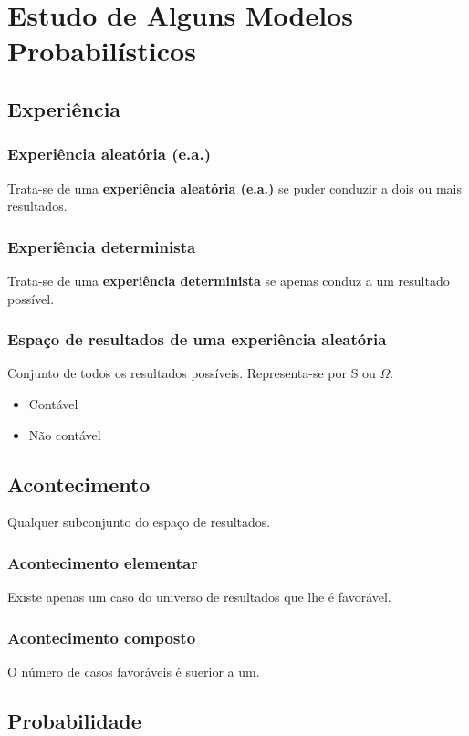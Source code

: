 \chapter{Estudo de Alguns Modelos Probabilísticos}

\section{Experiência}

\subsection{Experiência aleatória (e.a.)}
Trata-se de uma \textbf{experiência aleatória (e.a.)} se puder conduzir a dois ou mais resultados.

\subsection{Experiência determinista}
Trata-se de uma \textbf{experiência determinista} se apenas conduz a um resultado possível.

\subsection{Espaço de resultados de uma experiência aleatória}
Conjunto de todos os resultados possíveis.
Representa-se por S ou $\Omega$.
\begin{itemize}
    \item Contável
    \item Não contável
\end{itemize}

\section{Acontecimento}
Qualquer subconjunto do espaço de resultados.

\subsection{Acontecimento elementar}
Existe apenas um caso do universo de resultados que lhe é favorável.

\subsection{Acontecimento composto}
O número de casos favoráveis é suerior a um.

\section{Probabilidade}

